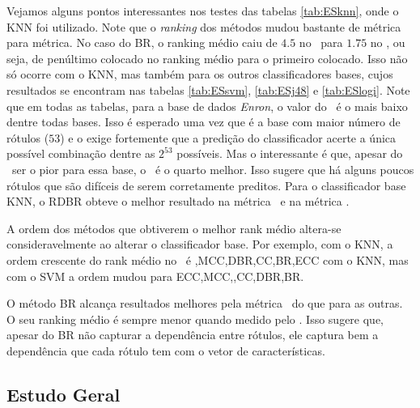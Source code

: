 Vejamos alguns pontos interessantes nos testes das tabelas
\ref{tab:ESknn}, onde o KNN foi utilizado.
Note que o \textit{ranking} dos métodos mudou bastante de métrica para métrica.
No caso do BR, o ranking médio caiu de $4.5$ no \SA~para $1.75$ no \HL, ou seja,
de penúltimo colocado no ranking médio para o primeiro colocado. 
Isso não só ocorre com o KNN, mas também para os outros classificadores bases, cujos resultados
se encontram nas tabelas
\ref{tab:ESsvm}, \ref{tab:ESj48} e \ref{tab:ESlogi}.
Note que em todas as tabelas, para a base de dados \textit{Enron},
o valor do \SA~é o mais baixo dentre todas bases.
Isso é esperado uma vez que é a base com maior número de rótulos ($53$) e o \SA
exige fortemente que a predição do classificador acerte a única possível combinação dentre as $2^{53}$ possíveis.
Mas o interessante é que, apesar do \SA~ser o pior para essa base, o \HL~é o quarto melhor.
Isso sugere que há alguns poucos rótulos que são difíceis de serem corretamente preditos.
Para o classificador base KNN, o RDBR obteve o melhor resultado na métrica \SA~e na métrica \EBA.



A ordem dos métodos que obtiverem o melhor rank médio altera-se consideravelmente
ao alterar o classificador base.
Por exemplo,
com o KNN, a ordem crescente do rank médio no \SA~é \MRLMa,MCC,DBR,CC,BR,ECC com o KNN,
mas com o SVM a ordem mudou para ECC,MCC,\MRLMa,CC,DBR,BR.

O método BR alcança resultados melhores pela métrica \HL~do que para as outras.
O seu ranking médio é sempre menor quando medido pelo \HL. Isso sugere que, apesar
do BR não capturar a dependência entre rótulos, ele captura bem a dependência
que cada rótulo tem com o vetor de características.





\subsection{Estudo Geral}






